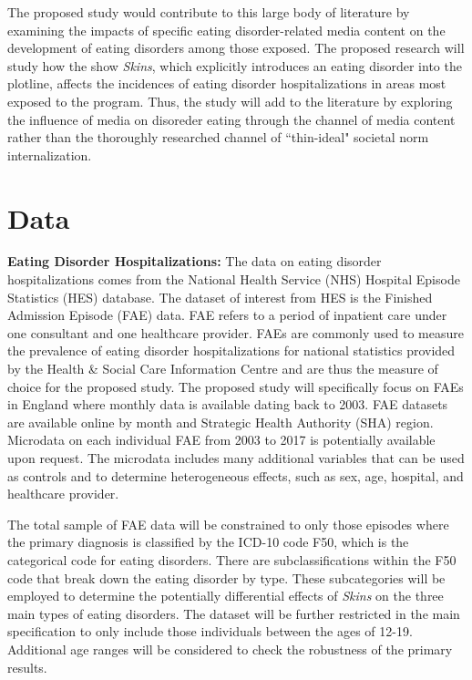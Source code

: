 \documentclass[12pt]{article}
\begin{document}
The proposed study would contribute to this large body of literature by examining the impacts of specific eating disorder-related media content on the development of eating disorders among those exposed. The proposed research will study how the show \textit{Skins}, which explicitly introduces an eating disorder into the plotline, affects the incidences of eating disorder hospitalizations in areas most exposed to the program. Thus, the study will add to the literature by exploring the influence of media on disoreder eating through the channel of media content rather than the thoroughly researched channel of ``thin-ideal" societal norm internalization.

\section{Data}

{\bf Eating Disorder Hospitalizations:} The data on eating disorder hospitalizations comes from the National Health Service (NHS) Hospital Episode Statistics (HES) database. The dataset of interest from HES is the Finished Admission Episode (FAE) data. FAE refers to a period of inpatient care under one consultant and one healthcare provider. FAEs are commonly used to measure the prevalence of eating disorder hospitalizations for national statistics provided by the Health \& Social Care Information Centre and are thus the measure of choice for the proposed study. The proposed study will specifically focus on FAEs in England where monthly data is available dating back to 2003. FAE datasets are available online by month and Strategic Health Authority (SHA) region. Microdata on each individual FAE from 2003 to 2017 is potentially available upon request. The microdata includes many additional variables that can be used as controls and to determine heterogeneous effects, such as sex, age, hospital, and healthcare provider.


The total sample of FAE data will be constrained to only those episodes where the primary diagnosis is classified by the ICD-10 code F50, which is the categorical code for eating disorders. There are subclassifications within the F50 code that break down the eating disorder by type. These subcategories will be employed to determine the potentially differential effects of \textit{Skins} on the three main types of eating disorders. The dataset will be further restricted in the main specification to only include those individuals between the ages of 12-19. Additional age ranges will be considered to check the robustness of the primary results.
\end{document}
